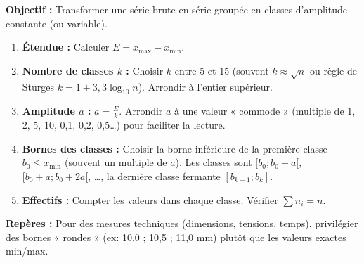 \documentclass[11pt]{article}
\begin{document}
\begin{methode}
    \textbf{Objectif :} Transformer une série brute en série groupée en classes d'amplitude constante (ou variable).
    \begin{enumerate}
        \item \textbf{Étendue :} Calculer $E = x_{\max} - x_{\min}$.
        \item \textbf{Nombre de classes $k$ :} Choisir $k$ entre 5 et 15 (souvent $k \approx \sqrt{n}$ ou règle de Sturges $k = 1 + 3,3 \log_{10} n$). Arrondir à l'entier supérieur.
        \item \textbf{Amplitude $a$ :} $a = \frac{E}{k}$. Arrondir $a$ à une valeur « commode » (multiple de 1, 2, 5, 10, 0,1, 0,2, 0,5\ldots) pour faciliter la lecture.
        \item \textbf{Bornes des classes :} Choisir la borne inférieure de la première classe $b_0 \le x_{\min}$ (souvent un multiple de $a$). Les classes sont $[b_0; b_0+a[$, $[b_0+a; b_0+2a[$, \ldots, la dernière classe fermante $[b_{k-1}; b_k]$.
        \item \textbf{Effectifs :} Compter les valeurs dans chaque classe. Vérifier $\sum n_i = n$.
    \end{enumerate}
    \textbf{Repères :} Pour des mesures techniques (dimensions, tensions, temps), privilégier des bornes « rondes » (ex: 10,0 ; 10,5 ; 11,0 mm) plutôt que les valeurs exactes min/max.
\end{methode}
\end{document}
